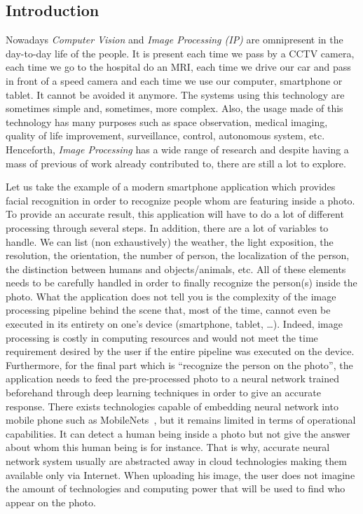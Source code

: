 \subsection*{Introduction}


Nowadays \emph{Computer Vision} and \emph{Image Processing (IP)} are omnipresent in the day-to-day life of the people.
It is present each time we pass by a CCTV camera, each time we go to the hospital do an MRI, each time we drive our car
and pass in front of a speed camera and each time we use our computer, smartphone or tablet. It cannot be avoided it
anymore. The systems using this technology are sometimes simple and, sometimes, more complex. Also, the usage made of
this technology has many purposes such as space observation, medical imaging, quality of life improvement, surveillance,
control, autonomous system, etc. Henceforth, \emph{Image Processing} has a wide range of research and despite having a
mass of previous of work already contributed to, there are still a lot to explore.

Let us take the example of a modern smartphone application which provides facial recognition in order to recognize
people whom are featuring inside a photo. To provide an accurate result, this application will have to do a lot of
different processing through several steps. In addition, there are a lot of variables to handle. We can list (non
exhaustively) the weather, the light exposition, the resolution, the orientation, the number of person, the localization
of the person, the distinction between humans and objects/animals, etc. All of these elements needs to be carefully
handled in order to finally recognize the person(s) inside the photo. What the application does not tell you is the
complexity of the image processing pipeline behind the scene that, most of the time, cannot even be executed in its
entirety on one's device (smartphone, tablet, \ldots). Indeed, image processing is costly in computing resources and
would not meet the time requirement desired by the user if the entire pipeline was executed on the device. Furthermore,
for the final part which is ``recognize the person on the photo'', the application needs to feed the pre-processed photo
to a neural network trained beforehand through deep learning techniques in order to give an accurate response. There
exists technologies capable of embedding neural network into mobile phone such as
MobileNets~\parencite{howard.2017.mobilenets}, but it remains limited in terms of operational capabilities. It can
detect a human being inside a photo but not give the answer about whom this human being is for instance. That is why,
accurate neural network system usually are abstracted away in cloud technologies making them available only via
Internet. When uploading his image, the user does not imagine the amount of technologies and computing power that will
be used to find who appear on the photo.

